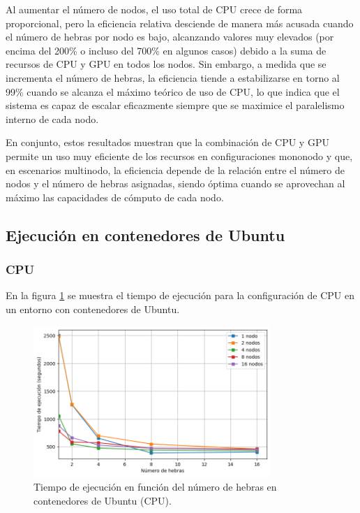Al aumentar el número de nodos, el uso total de CPU crece de forma proporcional, pero la eficiencia relativa desciende de manera más acusada cuando el número de hebras por nodo es bajo, alcanzando valores muy elevados (por encima del 200\% o incluso del 700\% en algunos casos) debido a la suma de recursos de CPU y GPU en todos los nodos. Sin embargo, a medida que se incrementa el número de hebras, la eficiencia tiende a estabilizarse en torno al 99\% cuando se alcanza el máximo teórico de uso de CPU, lo que indica que el sistema es capaz de escalar eficazmente siempre que se maximice el paralelismo interno de cada nodo.

En conjunto, estos resultados muestran que la combinación de CPU y GPU permite un uso muy eficiente de los recursos en configuraciones mononodo y que, en escenarios multinodo, la eficiencia depende de la relación entre el número de nodos y el número de hebras asignadas, siendo óptima cuando se aprovechan al máximo las capacidades de cómputo de cada nodo.


\subsection{Ejecución en contenedores de Ubuntu}
\subsubsection{CPU}

En la figura \ref{fig:thread_sweep_ubuntu_docker_time} se muestra el tiempo de ejecución para la configuración de CPU en un entorno con contenedores de Ubuntu.

\begin{figure}[H]
    \centering
    \includegraphics[width=0.8\textwidth]{imagenes/cap5/thread_sweep_ubuntu_docker_time.png}
    \caption{Tiempo de ejecución en función del número de hebras en contenedores de Ubuntu (CPU).}
    \label{fig:thread_sweep_ubuntu_docker_time}
\end{figure}

